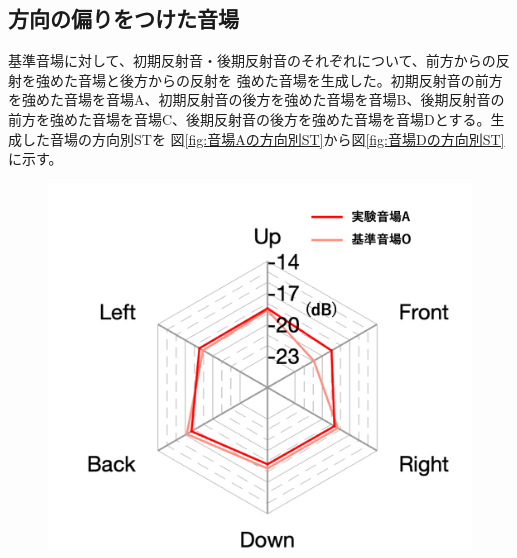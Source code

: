 \documentclass[11pt,a4j]{jreport}
\begin{document}

  \subsection{方向の偏りをつけた音場}
  基準音場に対して、初期反射音・後期反射音のそれぞれについて、前方からの反射を強めた音場と後方からの反射を
  強めた音場を生成した。初期反射音の前方を強めた音場を音場A、初期反射音の後方を強めた音場を音場B、後期反射音の
  前方を強めた音場を音場C、後期反射音の後方を強めた音場を音場Dとする。生成した音場の方向別STを
  図\ref{fig:音場Aの方向別ST}から図\ref{fig:音場Dの方向別ST}に示す。

  \begin{figure}[H]
    \begin{minipage}[b]{.5\linewidth}
        \centering
        \includegraphics[width=1\linewidth]{images/experimentField/withLegend/expAEarly.png}
    \end{minipage}%
    \begin{minipage}[b]{.5\linewidth}
        \centering

\end{minipage}
\end{figure}
\end{document}

